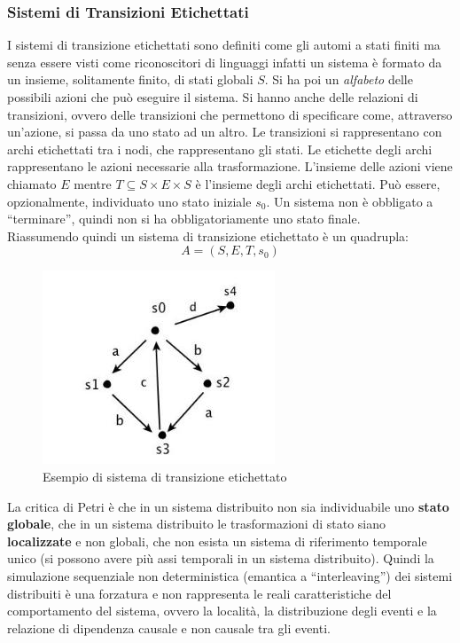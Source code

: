 \documentclass[a4paper,12pt, oneside]{book}
\begin{document}
\subsubsection{Sistemi di Transizioni Etichettati}
\begin{definizione}
  I sistemi di transizione etichettati sono definiti come gli automi a stati
  finiti ma senza essere visti come riconoscitori di linguaggi infatti un sistema
  è formato da un insieme, solitamente finito, di stati globali $S$. Si ha poi un
  \textit{alfabeto} delle possibili azioni che può eseguire il sistema. Si hanno
  anche delle relazioni di transizioni, ovvero delle transizioni che permettono di
  specificare come, attraverso un'azione, si passa da uno stato ad un altro. Le
  transizioni si rappresentano con archi etichettati tra i nodi, che rappresentano
  gli stati. Le etichette degli archi rappresentano le azioni necessarie alla
  trasformazione. L'insieme delle azioni viene chiamato $E$ mentre $T\subseteq
  S\times E\times S$ è l'insieme degli archi etichettati. Può essere,
  opzionalmente, individuato uno stato iniziale $s_0$. Un sistema non è obbligato
  a ``terminare'', quindi non si ha obbligatoriamente uno stato finale.\\
  Riassumendo quindi un sistema di transizione etichettato è un quadrupla:
  \[A=(S,E,T,s_0)\]
  \begin{figure}[H]
    \centering
    \includegraphics[scale = 0.5]{img/ste.jpg}
    \caption{Esempio di sistema di transizione etichettato}
  \end{figure}
\end{definizione}
La critica di Petri è che in un sistema distribuito non sia individuabile uno
\textbf{stato globale}, che in un sistema distribuito le trasformazioni di stato
siano \textbf{localizzate} e non globali, che non esista un sistema di
riferimento temporale unico (si possono avere più assi temporali in un sistema
distribuito). Quindi la simulazione sequenziale non deterministica (emantica a
``interleaving'') dei sistemi distribuiti è una forzatura e non rappresenta le
reali caratteristiche del comportamento del sistema, ovvero la località, la
distribuzione degli eventi e la relazione di dipendenza causale e non causale
tra gli eventi.
\end{document}
